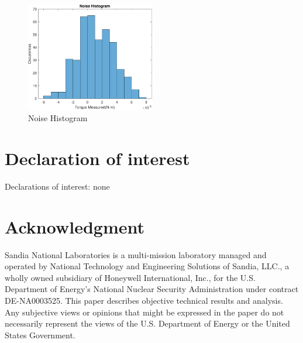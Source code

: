 \documentclass[11pt, letterpaper]{article}
\begin{document}
\begin{itemize}
\begin{figure}[tb]
  \centering
  \includegraphics[width=0.5\textwidth]{diagrams/NoiseHistogram.pdf}
  \caption{Noise Histogram}
  \label{fig:NoiseHistogram}
\end{figure}

\end{itemize}

\section{Declaration of interest}
Declarations of interest: none

\section*{Acknowledgment}
Sandia National Laboratories is a multi-mission laboratory managed and operated by National Technology and Engineering Solutions of Sandia, LLC., a wholly owned subsidiary of Honeywell International, Inc., for the U.S. Department of Energy's National Nuclear Security Administration under contract DE-NA0003525.
This paper describes objective technical results and analysis.
Any subjective views or opinions that might be expressed in the paper do not necessarily represent the views of the U.S. Department of Energy or the United States Government.
\end{document}
